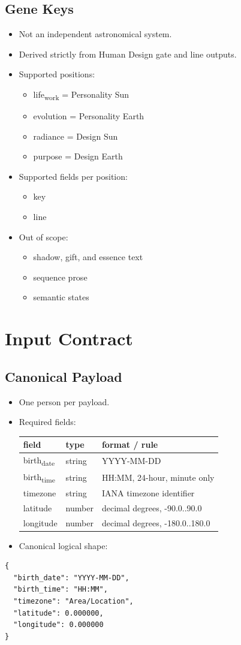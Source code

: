 \documentclass[11pt]{article}
\begin{document}
\subsection{Gene Keys}
\label{sec:org77c55f7}
\begin{itemize}
\item Not an independent astronomical system.
\item Derived strictly from Human Design gate and line outputs.
\item Supported positions:
\begin{itemize}
\item life\textsubscript{work} = Personality Sun
\item evolution = Personality Earth
\item radiance = Design Sun
\item purpose = Design Earth
\end{itemize}
\item Supported fields per position:
\begin{itemize}
\item key
\item line
\end{itemize}
\item Out of scope:
\begin{itemize}
\item shadow, gift, and essence text
\item sequence prose
\item semantic states
\end{itemize}
\end{itemize}
\section{Input Contract}
\label{sec:org2cbbb99}
\subsection{Canonical Payload}
\label{sec:org1d558b1}
\begin{itemize}
\item One person per payload.
\item Required fields:
\begin{center}
\begin{tabular}{lll}
field & type & format / rule\\
\hline
birth\textsubscript{date} & string & YYYY-MM-DD\\
birth\textsubscript{time} & string & HH:MM, 24-hour, minute only\\
timezone & string & IANA timezone identifier\\
latitude & number & decimal degrees, -90.0..90.0\\
longitude & number & decimal degrees, -180.0..180.0\\
\end{tabular}
\end{center}
\item Canonical logical shape:
\end{itemize}
\begin{verbatim}
{
  "birth_date": "YYYY-MM-DD",
  "birth_time": "HH:MM",
  "timezone": "Area/Location",
  "latitude": 0.000000,
  "longitude": 0.000000
}
\end{verbatim}
\end{document}
